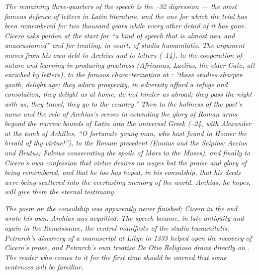 \textit{The remaining three-quarters of the speech is the
--32 digression --- the most famous defence
of letters in Latin literature, and the one for which the
trial has been remembered for two thousand years while every
other detail of it has gone. Cicero asks pardon at the start
for ``a kind of speech that is almost new and unaccustomed''
and for treating, in court, of \textit{studia humanitatis}.
The argument moves from his own debt to Archias and to
letters (--14), to the cooperation of nature
and learning in producing greatness (Africanus, Laelius, the
elder Cato, all enriched by letters), to the famous
characterization at : ``these studies sharpen
youth, delight age; they adorn prosperity, in adversity
afford a refuge and consolation; they delight us at home, do
not hinder us abroad; they pass the night with us, they
travel, they go to the country.'' Then to the holiness of the
poet's name and the role of Archias's verses in extending the
glory of Roman arms beyond the narrow bounds of Latin into
the universal Greek (--24, with Alexander at
the tomb of Achilles, ``O fortunate young man, who hast found
in Homer the herald of thy virtue!''), to the Roman precedent
(Ennius and the Scipios; Accius and Brutus; Fulvius
consecrating the spoils of Mars to the Muses), and finally to
Cicero's own confession that virtue desires no wages but the
praise and glory of being remembered, and that he too has
hoped, in his consulship, that his deeds were being scattered
into the everlasting memory of the world. Archias, he hopes,
will give them the eternal testimony.}

\textit{The poem on the consulship was apparently never
finished; Cicero in the end wrote his own. Archias was
acquitted. The speech became, in late antiquity and again in
the Renaissance, the central manifesto of the studia
humanitatis: Petrarch's discovery of a manuscript at Li\`ege
in 1333 helped open the recovery of Cicero's prose, and
Petrarch's own treatise \textit{De Otio Religioso} draws
directly on . The reader who comes to it for
the first time should be warned that some sentences will be
familiar.}
